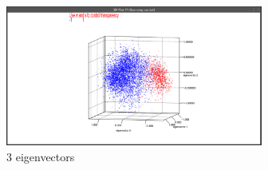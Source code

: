 \documentclass[a4paper,12pt,english]{report}
\begin{document}
\begin{figure}[htb]
\centering
\includegraphics[width=240pt]{fig14.png}
\caption{3 eigenvectors}
\end{figure}
\end{document}

